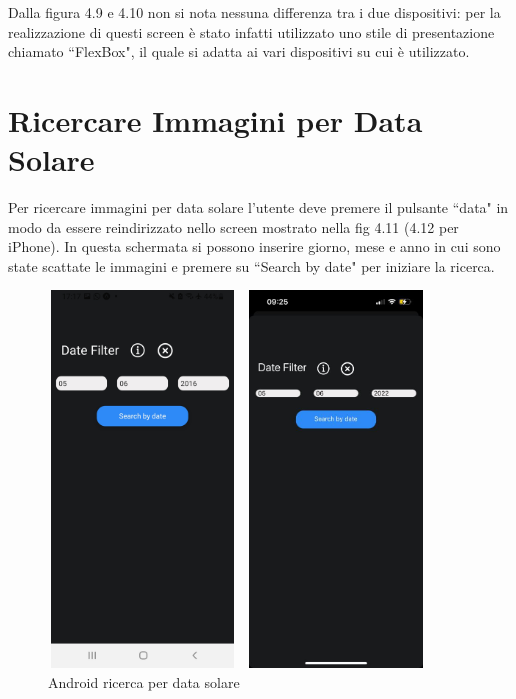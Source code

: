 Dalla figura 4.9 e 4.10 non si nota nessuna differenza tra i due dispositivi: per la realizzazione di questi screen \`e stato infatti utilizzato uno stile di
presentazione chiamato ``FlexBox", il quale si adatta ai vari dispositivi su cui \`e utilizzato.

\section*{Ricercare Immagini per Data Solare}
Per ricercare immagini per data solare l'utente deve premere il pulsante ``data" in modo da essere reindirizzato nello screen mostrato nella fig 4.11 (4.12 per iPhone). 
In questa schermata si possono inserire giorno, mese e anno in cui sono state scattate le immagini e premere su ``Search by date" per iniziare la ricerca.
\begin{figure}[h]
    \begin{minipage}[h]{0.47\textwidth}
        \centering
        \includegraphics[width=5cm, height=10cm]{images/immaginiAndroid/SearchbyDate.jpg}
        \caption{\label{SearchbyDateAndroid} Android ricerca per data solare}
    \end{minipage}
    \hfill
    \begin{minipage}[h]{0.47\textwidth}
        \centering
        \includegraphics[width=5cm, height=10cm]{images/immaginiPhone/SearchbyDate.jpeg}

\end{minipage}
\end{figure}

